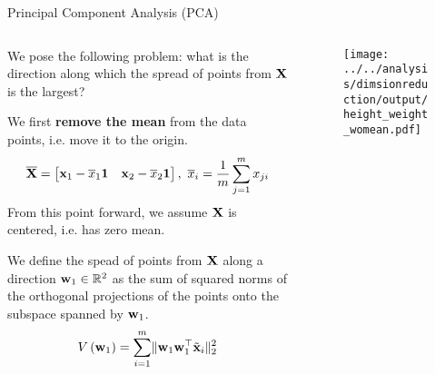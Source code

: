 \documentclass[aspectratio=169]{beamer}
\def\mf{\ensuremath\mathbf}
\def\mb{\ensuremath\mathbb}
\def\lp{\ensuremath\left(}
\def\rp{\ensuremath\right)}
\def\bmx{\ensuremath\begin{bmatrix*}[r]}
\def\emx{\ensuremath\end{bmatrix*}}
\newcommand{\ct}[1]{\lp #1\rp}
\begin{document}
\begin{frame}[t]{Principal Component Analysis (PCA)}
  \begin{columns}
    \begin{column}{0.55\textwidth}
      {\small
      We pose the following problem: what is the direction along which the spread of points from $\mf{X}$ is the largest?
      
      We first \textbf{remove the mean} from the data points, i.e. move it to the origin.
      \[ \overline{\mf{X}} = \bmx \mf{x}_1 - \overline{x}_1 \mf{1} & \mf{x}_2 -  \overline{x}_2 \mf{1} \emx, \,\, \overline{x}_i = \frac{1}{m}\sum_{j=1}^m x_{ji} \]
      From this point forward, we assume $\mf{X}$ is centered, i.e. has zero mean. 

      We define the spead of points from $\mf{X}$ along a direction $\mf{w}_1 \in \mb{R}^2$ as the sum of squared norms of the orthogonal projections of the points onto the subspace spanned by $\mf{w}_1$.
      \[ V\ct{\mf{w}_1} = \sum_{i=1}^m \lVert \mf{w}_1\mf{w}_1^\top \tilde{\mf{x}}_i \rVert_2^2 \]
      }
    \end{column}
    \begin{column}{0.425\textwidth}
      \begin{figure}
        \centering
        \texttt{[image: ../../analysis/dimsionreduction/output/height\_weight\_womean.pdf]}
      \end{figure}
    \end{column}
  \end{columns}
\end{frame}
\end{document}
